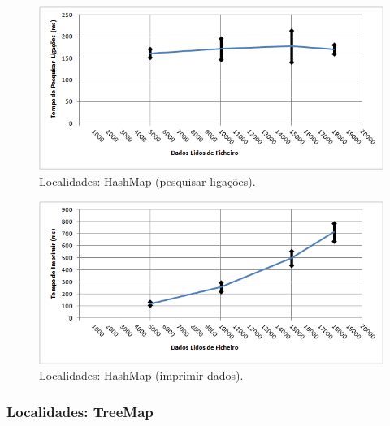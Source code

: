 \documentclass[a5paper,twocolumn, 11pt]{article}
\begin{document}
\begin{figure}[h!b!t!]
    \caption[Localidades: HashMap (pesquisar ligações)]{Localidades: HashMap (pesquisar ligações).}
    \label{hashtable}
    \centering
        \includegraphics[width=400pt]{cloc_conf3_o4.png}
\end{figure}
\begin{figure}[h!b!t!]
    \caption[Localidades: HashMap (imprimir dados)]{Localidades: HashMap (imprimir dados).}
    \label{hashtable}
    \centering
        \includegraphics[width=400pt]{cloc_conf3_o5.png}
\end{figure}

\newpage
\twocolumn
\subsubsection{Localidades: TreeMap}
\end{document}
